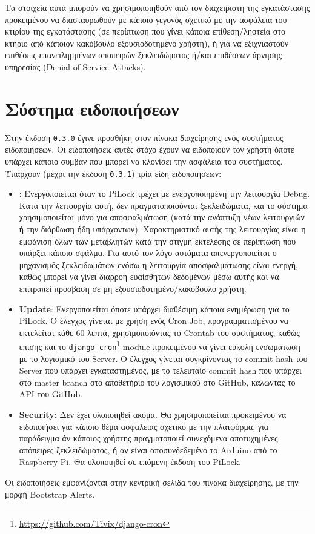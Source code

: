 	Τα στοιχεία αυτά μπορούν να χρησιμοποιηθούν από τον διαχειριστή της εγκατάστασης προκειμένου να διασταυρωθούν με κάποιο γεγονός σχετικό με την ασφάλεια του κτιρίου της εγκατάστασης (σε περίπτωση που γίνει κάποια επίθεση/ληστεία στο κτήριο από κάποιον κακόβουλο εξουσιοδοτημένο χρήστη), ή για να εξιχνιαστούν επιθέσεις επανειλημμένων αποπειρών ξεκλειδώματος ή/και επιθέσεων άρνησης υπηρεσίας (Denial of Service Attacks).

\section{Σύστημα ειδοποιήσεων}
	\label{sec:notifications}
	Στην έκδοση \verb|0.3.0| έγινε προσθήκη στον πίνακα διαχείρησης ενός συστήματος ειδοποιήσεων. Οι ειδοποιήσεις αυτές στόχο έχουν να ειδοποιούν τον χρήστη όποτε υπάρχει κάποιο συμβάν που μπορεί να κλονίσει την ασφάλεια του συστήματος. Υπάρχουν (μέχρι την έκδοση \verb|0.3.1|) τρία είδη ειδοποιήσεων:

	\begin{itemize}
		\item \textbf{}: Ενεργοποιείται όταν το PiLock τρέχει με ενεργοποιημένη την λειτουργία Debug. Κατά την λειτουργία αυτή, δεν πραγματοποιούνται ξεκλειδώματα, και το σύστημα χρησιμοποιείται μόνο για αποσφαλμάτωση (κατά την ανάπτυξη νέων λειτουργιών ή την διόρθωση ήδη υπάρχοντων). Χαρακτηριστικό αυτής της λειτουργίας είναι η εμφάνιση όλων των μεταβλητών κατά την στιγμή εκτέλεσης σε περίπτωση που υπάρξει κάποιο σφάλμα. Για αυτό τον λόγο αυτόματα απενεργοποιείται ο μηχανισμός ξεκλειδωμάτων ενόσω η λειτουργία αποσφαλμάτωσης είναι ενεργή, καθώς μπορεί να γίνει διαρροή ευαίσθητων δεδομένων μέσω αυτής και να επιτραπεί πρόσβαση σε μη εξουσιοδοτημένο/κακόβουλο χρήστη.
		\item \textbf{Update}: Ενεργοποιείται όποτε υπάρχει διαθέσιμη κάποια ενημέρωση για το PiLock. Ο έλεγχος γίνεται με χρήση ενός Cron Job, προγραμματισμένου να εκτελείται κάθε 60 λεπτά, χρησιμοποιόντας το Crontab του συστήματος, καθώς επίσης και το \verb|django-cron|\footnote{\url{https://github.com/Tivix/django-cron}} module προκειμένου να γίνει εύκολη ενσωμάτωση με το λογισμικό του Server. Ο έλεγχος γίνεται συγκρίνοντας το commit hash του Server που υπάρχει εγκαταστημένος, με το τελευταίο commit hash που υπάρχει στο master branch στο αποθετήριο του λογισμικού στο GitHub, καλώντας το API του GitHub.
		\item \textbf{Security}: Δεν έχει υλοποιηθεί ακόμα. Θα χρησιμοποιείται προκειμένου να ειδοποιήσει για κάποιο θέμα ασφαλείας σχετικό με την πλατφόρμα, για παράδειγμα άν κάποιος χρήστης πραγματοποιεί συνεχόμενα αποτυχημένες απόπειρες ξεκλειδώματος, ή αν είναι αποσυνδεδεμένο το Arduino από το Raspberry Pi. Θα υλοποιηθεί σε επόμενη έκδοση του PiLock.
	\end{itemize}

	Οι ειδοποιήσεις εμφανίζονται στην κεντρική σελίδα του πίνακα διαχείρησης, με την μορφή Bootstrap Alerts.

